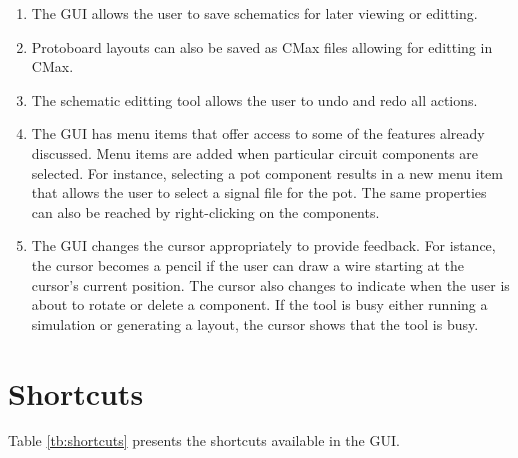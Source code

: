 \begin{enumerate}
\item The GUI allows the user to save schematics for later viewing or editting.
\item Protoboard layouts can also be saved as CMax files allowing for editting
in CMax.
\item The schematic editting tool allows the user to undo and redo all actions.
\item The GUI has menu items that offer access to some of the features already
discussed. Menu items are added when particular circuit components are selected.
For instance, selecting a pot component results in a new menu item that allows
the user to select a signal file for the pot. The same properties can also be
reached by right-clicking on the components.
\item The GUI changes the cursor appropriately to provide feedback. For istance,
the cursor becomes
a pencil if the user can draw a wire starting at the cursor's current position.
The cursor also changes to indicate when the user is about to rotate or delete
a component. If the tool is busy either running a simulation or generating a
layout, the cursor shows that the tool is busy.
\end{enumerate}

\section{Shortcuts}
Table \ref{tb:shortcuts} presents the shortcuts available in the GUI.

